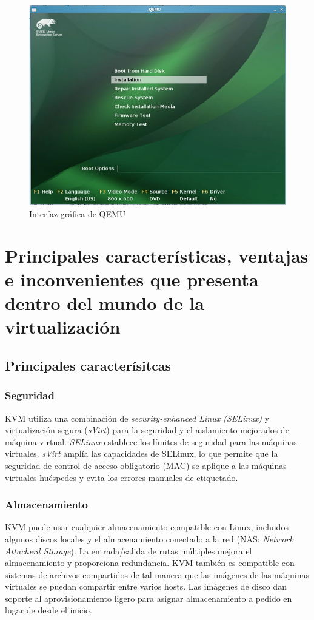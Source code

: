 \documentclass[11pt]{article}
\begin{document}
\begin{figure}
\centering
\caption{Interfaz gráfica de QEMU}
\label{interfaz qemu}
\includegraphics[width=1\textwidth, scale=1]{qemu.jpg}
\end{figure}

\section[Principales características, ventajas e inconvenientes]{Principales características, ventajas e inconvenientes que presenta dentro del mundo de la virtualización}
\subsection{Principales caracterísitcas}
\subsubsection{Seguridad}
KVM utiliza una combinación de \textit{security-enhanced Linux (SELinux)} y virtualización segura (\textit{sVirt}) para la seguridad y el aislamiento mejorados de máquina virtual. \textit{SELinux} establece los límites de seguridad para las máquinas virtuales. \textit{sVirt} amplía las capacidades de SELinux, lo que permite que la seguridad de control de acceso obligatorio (MAC) se aplique a las máquinas virtuales huéspedes y evita los errores manuales de etiquetado.

\subsubsection{Almacenamiento}
KVM puede usar cualquier almacenamiento compatible con Linux, incluidos algunos discos locales y el almacenamiento conectado a la red (NAS: \textit{Network Attacherd Storage}). La entrada/salida de rutas múltiples mejora el almacenamiento y proporciona redundancia. KVM también es compatible con sistemas de archivos compartidos de tal manera que las imágenes de las máquinas virtuales se puedan compartir entre varios hosts. Las imágenes de disco dan soporte al aprovisionamiento ligero para asignar almacenamiento a pedido en lugar de desde el inicio.
\end{document}
